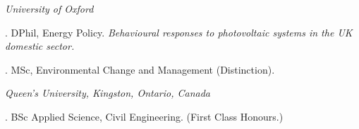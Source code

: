 \documentclass[11pt,a4paper]{article}
\begin{document}

\noindent{}%
%
\emph{University of Oxford \vspace{0.01in}}

.  DPhil, Energy Policy. \emph{Behavioural responses to photovoltaic systems in the UK domestic sector.}

.  MSc, Environmental Change and Management (Distinction).

\medskip

\noindent\emph{Queen's University, Kingston, Ontario, Canada\vspace{0.02in}}

. BSc Applied Science, Civil Engineering. (First Class Honours.) 

\bigskip
 
\begin{publications}
%
%
%
%
%
%
%  
%
%
%
%
\end{publications}
\end{document}
